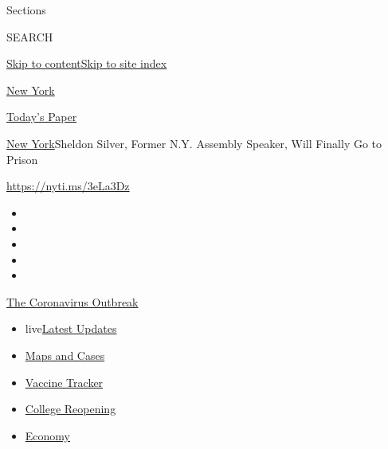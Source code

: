 Sections

SEARCH

\protect\hyperlink{site-content}{Skip to
content}\protect\hyperlink{site-index}{Skip to site index}

\href{https://www.nytimes.com/section/nyregion}{New York}

\href{https://myaccount.nytimes.com/auth/login?response_type=cookie\&client_id=vi}{}

\href{https://www.nytimes.com/section/todayspaper}{Today's Paper}

\href{/section/nyregion}{New York}\textbar{}Sheldon Silver, Former N.Y.
Assembly Speaker, Will Finally Go to Prison

\url{https://nyti.ms/3eLa3Dz}

\begin{itemize}
\item
\item
\item
\item
\item
\end{itemize}

\href{https://www.nytimes.com/news-event/coronavirus?action=click\&pgtype=Article\&state=default\&region=TOP_BANNER\&context=storylines_menu}{The
Coronavirus Outbreak}

\begin{itemize}
\tightlist
\item
  live\href{https://www.nytimes.com/2020/08/04/world/coronavirus-covid-19.html?action=click\&pgtype=Article\&state=default\&region=TOP_BANNER\&context=storylines_menu}{Latest
  Updates}
\item
  \href{https://www.nytimes.com/interactive/2020/us/coronavirus-us-cases.html?action=click\&pgtype=Article\&state=default\&region=TOP_BANNER\&context=storylines_menu}{Maps
  and Cases}
\item
  \href{https://www.nytimes.com/interactive/2020/science/coronavirus-vaccine-tracker.html?action=click\&pgtype=Article\&state=default\&region=TOP_BANNER\&context=storylines_menu}{Vaccine
  Tracker}
\item
  \href{https://www.nytimes.com/2020/08/02/us/covid-college-reopening.html?action=click\&pgtype=Article\&state=default\&region=TOP_BANNER\&context=storylines_menu}{College
  Reopening}
\item
  \href{https://www.nytimes.com/live/2020/08/03/business/stock-market-today-coronavirus?action=click\&pgtype=Article\&state=default\&region=TOP_BANNER\&context=storylines_menu}{Economy}
\end{itemize}

